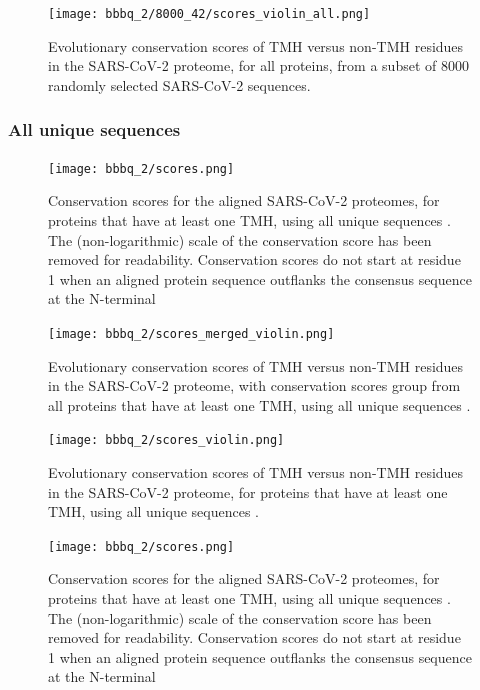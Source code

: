 \begin{figure}[!htbp]
  \texttt{[image: bbbq\_2/8000\_42/scores\_violin\_all.png]}
  \caption{
    Evolutionary conservation scores of TMH versus non-TMH
    residues in the SARS-CoV-2 proteome,
    for all proteins,
    from a subset of 8000 randomly selected SARS-CoV-2 sequences.
  }
  \label{fig:evolutionary_conservation_8k_all_violin}
\end{figure}

\subsubsection{All unique sequences}

\begin{figure}[!htbp]
  \texttt{[image: bbbq\_2/scores.png]}
  \caption{
    Conservation scores for the aligned SARS-CoV-2 proteomes,
    for proteins that have at least one TMH,
    using all unique sequences .
    The (non-logarithmic) scale of the conservation score has been removed
    for readability.
    Conservation scores do not start at residue 1 when
    an aligned protein sequence outflanks the consensus sequence 
    at the N-terminal
  }
  \label{fig:evolutionary_conservation_all_unique}
\end{figure}

\begin{figure}[!htbp]
  \texttt{[image: bbbq\_2/scores\_merged\_violin.png]}
  \caption{
    Evolutionary conservation scores of TMH versus non-TMH
    residues in the SARS-CoV-2 proteome,
    with conservation scores group from all proteins that have at least one TMH,
    using all unique sequences .
  }
  \label{fig:evolutionary_conservation_all_unique_merged}
\end{figure}

\begin{figure}[!htbp]
  \texttt{[image: bbbq\_2/scores\_violin.png]}
  \caption{
    Evolutionary conservation scores of TMH versus non-TMH
    residues in the SARS-CoV-2 proteome,
    for proteins that have at least one TMH,
    using all unique sequences .
  }
  \label{fig:evolutionary_conservation_all_unique_violin}
\end{figure}

\begin{figure}[!htbp]
  \texttt{[image: bbbq\_2/scores.png]}
  \caption{
    Conservation scores for the aligned SARS-CoV-2 proteomes,
    for proteins that have at least one TMH,
    using all unique sequences .
    The (non-logarithmic) scale of the conservation score has been removed
    for readability.
    Conservation scores do not start at residue 1 when
    an aligned protein sequence outflanks the consensus sequence 
    at the N-terminal
  }
  \label{fig:evolutionary_conservation_all_unique}
\end{figure}

